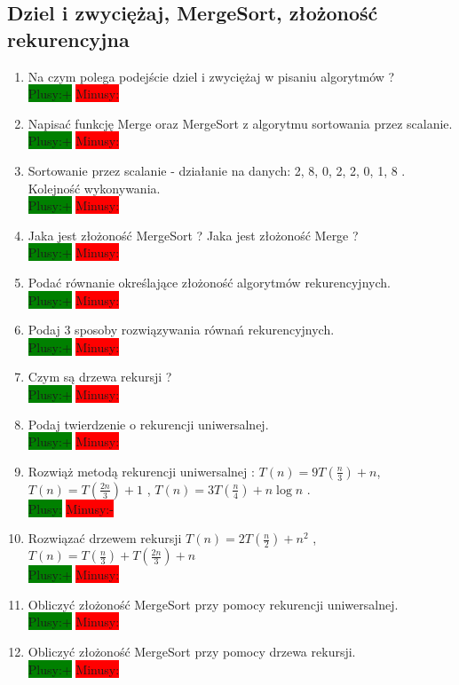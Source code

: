 \documentclass[a4paper,11pt]{article}
\begin{document}
\subsection{Dziel i zwyciężaj, MergeSort, złożoność rekurencyjna}
\begin{enumerate}
\item Na czym polega podejście dziel i zwyciężaj w pisaniu algorytmów ?\\ \colorbox{green}{Plusy:+} \colorbox{red}{Minusy: }

\item Napisać funkcję Merge oraz MergeSort z algorytmu sortowania przez scalanie.\\ \colorbox{green}{Plusy:+} \colorbox{red}{Minusy: }

\item Sortowanie przez scalanie - działanie na danych: 2, 8, 0, 2, 2, 0, 1, 8 . Kolejność wykonywania.\\  \colorbox{green}{ Plusy:+} \colorbox{red}{Minusy: }

\item Jaka jest złożoność MergeSort ? Jaka jest złożoność Merge ? \\ \colorbox{green}{Plusy:+} \colorbox{red}{Minusy: }

\item Podać równanie określające złożoność algorytmów rekurencyjnych. \\ 
\colorbox{green}{Plusy:+} \colorbox{red}{Minusy: }

\item Podaj 3 sposoby rozwiązywania równań rekurencyjnych. \\ \colorbox{green}{Plusy:+} \colorbox{red}{Minusy: }

\item Czym są drzewa rekursji ? \\ 
\colorbox{green}{Plusy:+} \colorbox{red}{Minusy:}

\item Podaj twierdzenie o rekurencji uniwersalnej. \\ \colorbox{green}{Plusy:+} \colorbox{red}{Minusy: }

\item Rozwiąż metodą rekurencji uniwersalnej : \( T(n)=9T(\frac{n}{3})+n\), \( T(n)=T(\frac{2n}{3})+1\)  , \( T(n)=3T(\frac{n}{4})+n \log n\)  .  \\ \colorbox{green}{Plusy:} \colorbox{red}{Minusy:-}

\item Rozwiązać drzewem rekursji \( T(n)=2T(\frac{n}{2})+n^2 \) , \( T(n)=T(\frac{n}{3})+T(\frac{2n}{3})+n \)\\ \colorbox{green}{Plusy:+} \colorbox{red}{Minusy: }

\item Obliczyć złożoność MergeSort przy pomocy rekurencji uniwersalnej. \\ \colorbox{green}{Plusy:+} \colorbox{red}{Minusy: }

\item Obliczyć złożoność MergeSort przy pomocy drzewa rekursji.\\  \colorbox{green}{Plusy:+} \colorbox{red}{Minusy: }
\end{enumerate}
\end{document}
